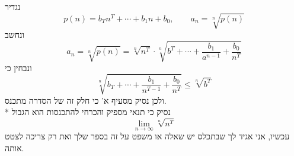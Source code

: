 



נגדיר
\[
	p(n) = b_T n^T + \cdots + b_1 n + b_0,
	\qquad
	a_n = \sqrt[n]{p(n)}
\]
ונחשב
\[
	a_n = \sqrt[n]{p(n)}
	= \sqrt[n]{n^T} \cdot \sqrt[n]{b^T + \cdots + \frac{b_1}{a^{n - 1}} + \frac{b_0}{n^T}}
\]
ונבחין כי
\[
	\sqrt[n]{b_T + \cdots + \frac{b_1}{n^{T - 1}} + \frac{b_0}{n^T}}
	\le \sqrt[n]{b^T}
\]
ולכן נסיק מסעיף א' כי חלק זה של הסדרה מתכנס. \\*
נסיק כי תנאי מספיק והכרחי להתכנסות הוא הגבול
\[
	\lim_{n \to \infty} \sqrt[n]{n^T}
\]
עכשיו, אני אגיד לך שבתכלס יש שאלה או משפט על זה בספר שלך ואת רק צריכה לצטט אותה.


